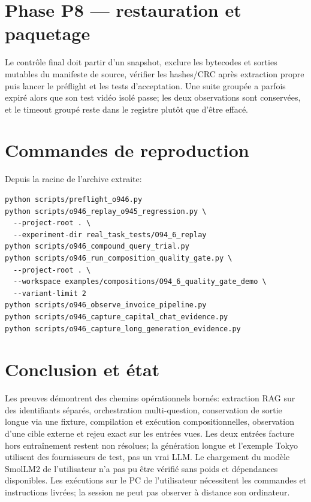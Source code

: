 \documentclass[11pt,a4paper]{article}
\begin{document}
\section{Phase P8 — restauration et paquetage}
Le contrôle final doit partir d'un snapshot, exclure les bytecodes et sorties mutables du manifeste de source, vérifier les hashes/CRC après extraction propre puis lancer le préflight et les tests d'acceptation. Une suite groupée a parfois expiré alors que son test vidéo isolé passe; les deux observations sont conservées, et le timeout groupé reste dans le registre plutôt que d'être effacé.

\section{Commandes de reproduction}
Depuis la racine de l'archive extraite:
\begin{verbatim}
python scripts/preflight_o946.py
python scripts/o946_replay_o945_regression.py \
  --project-root . \
  --experiment-dir real_task_tests/O94_6_replay
python scripts/o946_compound_query_trial.py
python scripts/o946_run_composition_quality_gate.py \
  --project-root . \
  --workspace examples/compositions/O94_6_quality_gate_demo \
  --variant-limit 2
python scripts/o946_observe_invoice_pipeline.py
python scripts/o946_capture_capital_chat_evidence.py
python scripts/o946_capture_long_generation_evidence.py
\end{verbatim}

\section{Conclusion et état}
Les preuves démontrent des chemins opérationnels bornés: extraction RAG sur des identifiants séparés, orchestration multi-question, conservation de sortie longue via une fixture, compilation et exécution compositionnelles, observation d'une cible externe et rejeu exact sur les entrées vues. Les deux entrées facture hors entraînement restent non résolues; la génération longue et l'exemple Tokyo utilisent des fournisseurs de test, pas un vrai LLM. Le chargement du modèle SmolLM2 de l'utilisateur n'a pas pu être vérifié sans poids et dépendances disponibles. Les exécutions sur le PC de l'utilisateur nécessitent les commandes et instructions livrées; la session ne peut pas observer à distance son ordinateur.
\end{document}

